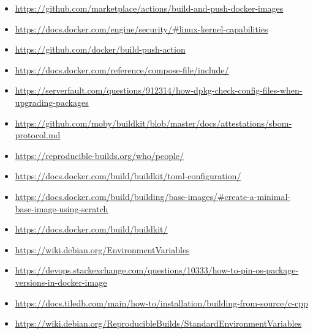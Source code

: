 \documentclass{article}
\begin{document}
\begin{itemize}
  \item \href{https://github.com/marketplace/actions/build-and-push-docker-images}{https://github.com/marketplace/actions/build-and-push-docker-images}
  \item \href{https://docs.docker.com/engine/security/\#linux-kernel-capabilities}{https://docs.docker.com/engine/security/\#linux-kernel-capabilities}
  \item \href{https://github.com/docker/build-push-action}{https://github.com/docker/build-push-action}
  \item \href{https://docs.docker.com/reference/compose-file/include/}{https://docs.docker.com/reference/compose-file/include/}
  \item \href{https://serverfault.com/questions/912314/how-dpkg-check-config-files-when-upgrading-packages}{https://serverfault.com/questions/912314/how-dpkg-check-config-files-when-upgrading-packages}
  \item \href{https://github.com/moby/buildkit/blob/master/docs/attestations/sbom-protocol.md}{https://github.com/moby/buildkit/blob/master/docs/attestations/sbom-protocol.md}
  \item \href{https://reproducible-builds.org/who/people/}{https://reproducible-builds.org/who/people/}
  \item \href{https://docs.docker.com/build/buildkit/toml-configuration/}{https://docs.docker.com/build/buildkit/toml-configuration/}
  \item \href{https://docs.docker.com/build/building/base-images/\#create-a-minimal-base-image-using-scratch}{https://docs.docker.com/build/building/base-images/\#create-a-minimal-base-image-using-scratch}
  \item \href{https://docs.docker.com/build/buildkit/}{https://docs.docker.com/build/buildkit/}
  \item \href{https://wiki.debian.org/EnvironmentVariables}{https://wiki.debian.org/EnvironmentVariables}
  \item \href{https://devops.stackexchange.com/questions/10333/how-to-pin-os-package-versions-in-docker-image}{https://devops.stackexchange.com/questions/10333/how-to-pin-os-package-versions-in-docker-image}
  \item \href{https://docs.tiledb.com/main/how-to/installation/building-from-source/c-cpp}{https://docs.tiledb.com/main/how-to/installation/building-from-source/c-cpp}
  \item \href{https://wiki.debian.org/ReproducibleBuilds/StandardEnvironmentVariables}{https://wiki.debian.org/ReproducibleBuilds/StandardEnvironmentVariables}

\end{itemize}
\end{document}

